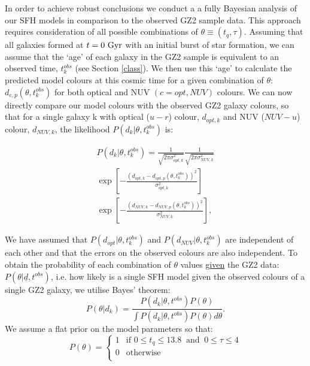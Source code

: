 \documentclass[useAMS,usenatbib]{mn2e}
\def\changed    {\color{titlecol} }
\begin{document}
In order to achieve robust conclusions we conduct a a fully Bayesian analysis \citep{Sivia, MacKay} of our SFH models in comparison to the observed GZ2 sample data. This approach requires consideration of all possible combinations of $\theta \equiv (t_{q}, \tau)$. Assuming that all galaxies formed at $t=0~\rm{Gyr}$ with an initial burst of star formation, we can assume that the `age' of each galaxy in the GZ2 sample is equivalent to an observed time, $t^{obs}_{k}$ (see Section \ref{class}). We then use this  `age' to calculate the predicted model colours at this cosmic time for a given combination of $\theta$: $d_{c,p}(\theta, t^{obs}_{k})$ for both optical and NUV $(c={opt,NUV})$ colours. We can now directly compare our model colours with the observed GZ2 galaxy colours, so that for a single galaxy k with optical ($u-r$) colour, $d_{opt, k}$ and NUV ($NUV-u$) colour, $d_{NUV,k}$, the {\changed likelihood $P(d_{k}|\theta, t^{obs}_{k})$ is}:

\begin{multline}\label{like}
P(d_{k}|\theta, t^{obs}_{k}) = \frac{1}{\sqrt{2\pi\sigma_{opt, k}^2}}\frac{1}{\sqrt{2\pi\sigma_{NUV, k}^2}} \\ \exp{\left[ - \frac{(d_{opt, k} - d_{opt, p}(\theta, t_{k}^{obs}))^2}{\sigma_{opt, k}^2} \right]} \\ \exp{\left[ - \frac{(d_{NUV, k} - d_{NUV, p}(\theta, t_{k}^{obs}))^2}{\sigma_{NUV, k}^2} \right]},
\end{multline}

We have assumed that $P(d_{opt}|\theta, t^{obs}_{k})$ and $P(d_{NUV}|\theta, t^{obs}_{k})$ are independent of each other and that the errors on the observed colours are also independent. To obtain the probability of each combination of $\theta$ values \underline{given} the GZ2 data: $P(\theta|\underline{d}, t^{obs})$, i.e. how likely is a single SFH model given the observed colours of a single GZ2 galaxy, {\changed we utilise Bayes' theorem}:
{\changed \begin{equation}\label{big}
P(\theta|d_k) = \frac{P(d_k|\theta, t^{obs})P(\theta)}{\int P(d_k |\theta, t^{obs})P(\theta) d\theta}.
\end{equation}}
{\changed We assume a flat prior on the model parameters so that:
\begin{equation}\label{prior}
P(\theta) =
\begin{cases}
1 & \text{if } 0 \leq t_q \leq 13.8 ~  \text{ and } ~ 0 \leq \tau \leq 4\\
0 & \text{otherwise} \\
\end{cases}
\end{equation}}
\end{document}
